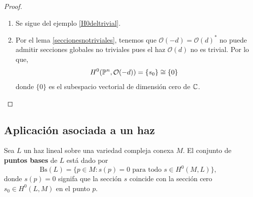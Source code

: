 \begin{proof}
\begin{enumerate}
			Consideremos un polinomio $P$ homogéneo de grado $d$, entonces en cada abierto $U_j$ podemos definir
			\begin{equation*}
				f_j([z])=\frac{P(z)}{z_j^d}.
			\end{equation*}
			Esta función es holomofa en $U_j$, y la expresión coincide en las intersecciones pues $P$ es un polinomio homogéneo de grado $d$. Por lo tanto, la colección $\{f_j\}_{j=0}^n$ determina una sección global holomorfa de $\mathcal{O}(d)$.
			
			\item Se sigue del ejemplo \ref{H0deltrivial}.
			
			\item Por el lema \ref{seccionesnotriviales}, tenemos que $\mathcal{O}(-d)=\mathcal{O}(d)^*$ no puede admitir secciones globales no triviales pues el haz $\mathcal{O}(d)$ no es trivial. Por lo que, 
			\begin{equation*}
				H^0(\mathbb{P}^n,\mathcal{O}(-d))=\{s_0\}\cong \{0\}
			\end{equation*}
			donde $\{0\}$ es el subespacio vectorial de dimensión cero de $\mathbb{C}$.
		\end{enumerate}
	\end{proof}
	
\subsection{Aplicación asociada a un haz}


    \begin{definition}
		Sea $L$ un haz lineal sobre una variedad compleja conexa $M$. El conjunto de \textbf{puntos bases} de $L$ está dado por
		\begin{equation*}
			\mathrm{Bs}(L)=\{p\in M:s(p)=0\text{ para todo }s\in H^0(M,L)\},
		\end{equation*}
		donde $s(p)=0$ signifa que la sección $s$ coincide con la sección cero $s_0\in H^0(L,M)$ en el punto $p$.
	\end{definition}

